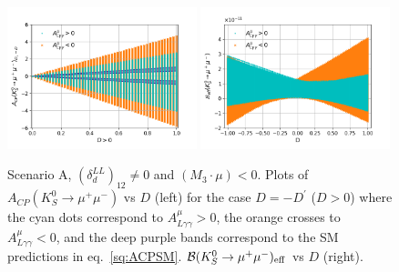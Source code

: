 \begin{figure}
\centering
\includegraphics[width=0.49\textwidth]{figs/Acp_SCA_LL_neg}
\includegraphics[width=0.49\textwidth]{figs/BR_eff_SCA_LL_neg}
 	\caption{\label{fig:Acp_BReff} Scenario A, $\left( \delta^{LL}_d \right)_{12} \neq 0$ and $(M_3 \cdot \mu) < 0$. Plots of $A_{CP}(K^0_S \rightarrow \mu^+ \mu^-)$ vs $D$ (left) for the case $D = -D^\prime$ ($D > 0$) where the cyan dots correspond to $A^\mu_{L\gamma \gamma} > 0$, the orange crosses to $A^\mu_{L\gamma \gamma} < 0$, and the deep purple bands correspond to the SM predictions in eq.~\eqref{sq:ACPSM}.  ${\cal B}(K^0_S \rightarrow \mu^+ \mu^-)_{{\rm eff}}$ vs $D$ (right).} 
\end{figure}

